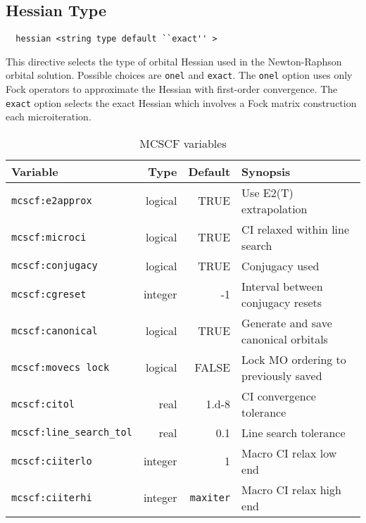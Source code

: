 \subsection{Hessian Type}
\begin{verbatim}
  hessian <string type default ``exact'' >
\end{verbatim}
This directive selects the type of orbital Hessian used in the
Newton-Raphson orbital solution. Possible choices are \verb+onel+ and
\verb+exact+. The \verb+onel+ option uses only Fock operators to
approximate the Hessian with first-order convergence. The \verb+exact+
option selects the exact Hessian which involves a Fock matrix
construction each microiteration. 

\begin{table}
\caption{MCSCF variables}
\label{MCSCF_variables}
\vspace{.2in}
\begin{tabular}{lrrl}
\hline\hline
Variable                        & Type     & Default          & Synopsis \\
\hline
\verb+mcscf:e2approx+           & logical  &  TRUE            & Use E2(T) extrapolation \\
\verb+mcscf:microci+            & logical  &  TRUE            & CI relaxed within line search \\
\verb+mcscf:conjugacy+          & logical  &  TRUE            & Conjugacy used \\
\verb+mcscf:cgreset+            & integer  &  -1              & Interval between conjugacy resets \\
\verb+mcscf:canonical+          & logical  &  TRUE            & Generate and save canonical orbitals \\
\verb+mcscf:movecs lock+        & logical  &  FALSE           & Lock MO ordering to previously saved \\
\verb+mcscf:citol+              & real     &  1.d-8           & CI convergence tolerance \\
\verb+mcscf:line_search_tol+    & real     &  0.1             & Line search tolerance  \\
\verb+mcscf:ciiterlo+           & integer  &  1               & Macro CI relax low end \\
\verb+mcscf:ciiterhi+           & integer  &  \verb+maxiter+  & Macro CI relax high end \\
\hline\hline
\end{tabular}
\end{table}

